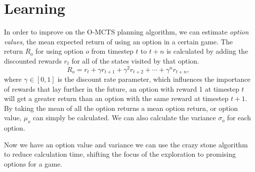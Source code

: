 \section{Learning}
\label{sec:learning}
In order to improve on the O-MCTS planning algorithm, we can estimate
\emph{option values}, the mean expected return of using an option in a certain
game. The return $R_o$ for using option $o$ from timestep $t$ to $t+n$ is
calculated by adding the discounted rewards $r_t$ for all of the
states visited by that option.  $$R_o = r_{t} + \gamma r_{t+1} + \gamma^2
r_{t+2} + \cdots + \gamma^n r_{t+n},$$ where $\gamma \in [0, 1]$ is the discount
rate parameter, which influences the importance of rewards that lay further in
the future, an option with reward 1 at timestep $t$ will get a greater return
than an option with the same reward at timestep $t+1$.
By taking the mean of all the option returns a mean option return, or option
value, $\mu_o$ can simply be calculated. We can also calculate the variance
$\sigma_o$ for each option. 

Now we have an option value and variance we can use the crazy stone algorithm
to reduce calculation time, shifting the focus of the exploration to promising
options for a game.

